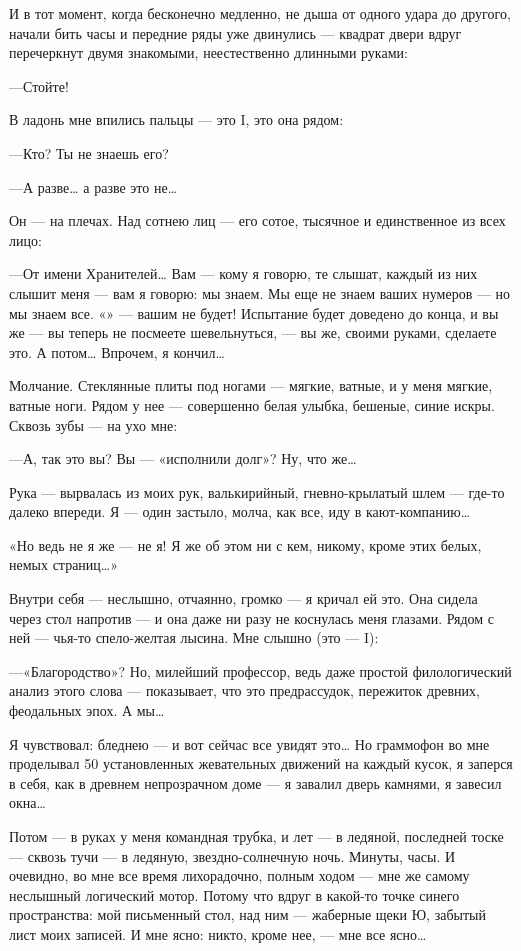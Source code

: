 \documentclass[11pt,openany]{book}
\begin{document}
И в тот момент, когда бесконечно медленно, не дыша от одного удара до другого, начали бить часы и передние ряды уже двинулись --- квадрат двери вдруг перечеркнут двумя знакомыми, неестественно длинными руками:

---Стойте!

В ладонь мне впились пальцы --- это I, это она рядом:

---Кто? Ты не знаешь его?

---А разве\ldots{} а разве это не\ldots{}

Он --- на плечах. Над сотнею лиц --- его сотое, тысячное и единственное из всех лицо:

---От имени Хранителей\ldots{} Вам --- кому я говорю, те слышат, каждый из них слышит меня --- вам я говорю: мы знаем. Мы еще не знаем ваших нумеров --- но мы знаем все. «» --- вашим не будет! Испытание будет доведено до конца, и вы же --- вы теперь не посмеете шевельнуться, --- вы же, своими руками, сделаете это. А потом\ldots{} Впрочем, я кончил\ldots{}

Молчание. Стеклянные плиты под ногами --- мягкие, ватные, и у меня мягкие, ватные ноги. Рядом у нее --- совершенно белая улыбка, бешеные, синие искры. Сквозь зубы --- на ухо мне:

---А, так это вы? Вы --- «исполнили долг»? Ну, что же\ldots{}

Рука --- вырвалась из моих рук, валькирийный, гневно-крылатый шлем --- где-то далеко впереди. Я --- один застыло, молча, как все, иду в кают-компанию\ldots{}

«Но ведь не я же --- не я! Я же об этом ни с кем, никому, кроме этих белых, немых страниц\ldots{}»

Внутри себя --- неслышно, отчаянно, громко --- я кричал ей это. Она сидела через стол напротив --- и она даже ни разу не коснулась меня глазами. Рядом с ней --- чья-то спело-желтая лысина. Мне слышно (это --- I):

---«Благородство»? Но, милейший профессор, ведь даже простой филологический анализ этого слова --- показывает, что это предрассудок, пережиток древних, феодальных эпох. А мы\ldots{}

Я чувствовал: бледнею --- и вот сейчас все увидят это\ldots{} Но граммофон во мне проделывал 50 установленных жевательных движений на каждый кусок, я заперся в себя, как в древнем непрозрачном доме --- я завалил дверь камнями, я завесил окна\ldots{}

Потом --- в руках у меня командная трубка, и лет --- в ледяной, последней тоске --- сквозь тучи --- в ледяную, звездно-солнечную ночь. Минуты, часы. И очевидно, во мне все время лихорадочно, полным ходом --- мне же самому неслышный логический мотор. Потому что вдруг в какой-то точке синего пространства: мой письменный стол, над ним --- жаберные щеки Ю, забытый лист моих записей. И мне ясно: никто, кроме нее, --- мне все ясно\ldots{}
\end{document}
